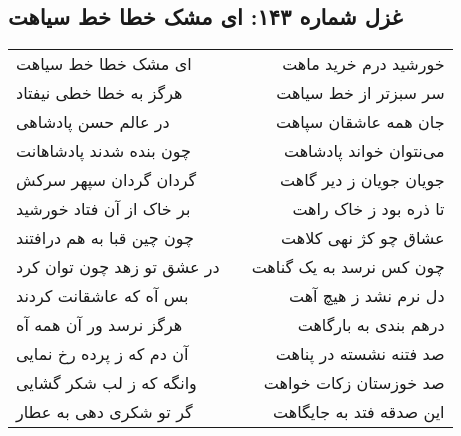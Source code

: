 \begin{center}
\section*{غزل شماره ۱۴۳: ای مشک خطا خط سیاهت}
\label{sec:143}
\begin{longtable}{l p{0.5cm} r}
ای مشک خطا خط سیاهت
&&
خورشید درم خرید ماهت
\\
هرگز به خطا خطی نیفتاد
&&
سر سبزتر از خط سیاهت
\\
در عالم حسن پادشاهی
&&
جان همه عاشقان سپاهت
\\
چون بنده شدند پادشاهانت
&&
می‌نتوان خواند پادشاهت
\\
گردان گردان سپهر سرکش
&&
جویان جویان ز دیر گاهت
\\
بر خاک از آن فتاد خورشید
&&
تا ذره بود ز خاک راهت
\\
چون چین قبا به هم درافتند
&&
عشاق چو کژ نهی کلاهت
\\
در عشق تو زهد چون توان کرد
&&
چون کس نرسد به یک گناهت
\\
بس آه که عاشقانت کردند
&&
دل نرم نشد ز هیچ آهت
\\
هرگز نرسد ور آن همه آه
&&
درهم بندی به بارگاهت
\\
آن دم که ز پرده رخ نمایی
&&
صد فتنه نشسته در پناهت
\\
وانگه که ز لب شکر گشایی
&&
صد خوزستان زکات خواهت
\\
گر تو شکری دهی به عطار
&&
این صدقه فتد به جایگاهت
\\
\end{longtable}
\end{center}
